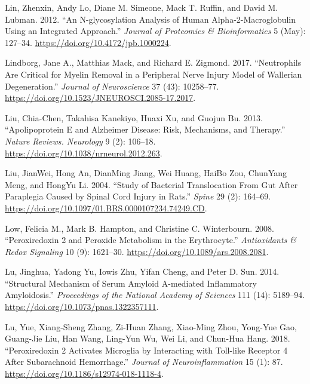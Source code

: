 \documentclass[9pt,lineno]{elife}
\newlength{\cslhangindent}
\newlength{\cslentryspacingunit} %
\newenvironment{CSLReferences}[2] %
 {%
  \setlength{\parindent}{0pt}
  \ifodd #1
  \let\oldpar\par
  \def\par{\hangindent=\cslhangindent\oldpar}
  \fi
  \setlength{\parskip}{#2\cslentryspacingunit}
 }%
 {}
\begin{document}
\begin{CSLReferences}{1}{0}
\leavevmode{}%
Lin, Zhenxin, Andy Lo, Diane M. Simeone, Mack T. Ruffin, and David M. Lubman. 2012. {``An {N-glycosylation Analysis} of {Human Alpha-2-Macroglobulin Using} an {Integrated Approach}.''} \emph{Journal of Proteomics \& Bioinformatics} 5 (May): 127--34. \url{https://doi.org/10.4172/jpb.1000224}.

\leavevmode{}%
Lindborg, Jane A., Matthias Mack, and Richard E. Zigmond. 2017. {``Neutrophils {Are Critical} for {Myelin Removal} in a {Peripheral Nerve Injury Model} of {Wallerian Degeneration}.''} \emph{Journal of Neuroscience} 37 (43): 10258--77. \url{https://doi.org/10.1523/JNEUROSCI.2085-17.2017}.

\leavevmode{}%
Liu, Chia-Chen, Takahisa Kanekiyo, Huaxi Xu, and Guojun Bu. 2013. {``Apolipoprotein {E} and {Alzheimer} Disease: Risk, Mechanisms, and Therapy.''} \emph{Nature Reviews. Neurology} 9 (2): 106--18. \url{https://doi.org/10.1038/nrneurol.2012.263}.

\leavevmode{}%
Liu, JianWei, Hong An, DianMing Jiang, Wei Huang, HaiBo Zou, ChunYang Meng, and HongYu Li. 2004. {``Study of {Bacterial Translocation From Gut After Paraplegia Caused} by {Spinal} Cord {Injury} in {Rats}.''} \emph{Spine} 29 (2): 164--69. \url{https://doi.org/10.1097/01.BRS.0000107234.74249.CD}.

\leavevmode{}%
Low, Felicia M., Mark B. Hampton, and Christine C. Winterbourn. 2008. {``Peroxiredoxin 2 and {Peroxide Metabolism} in the {Erythrocyte}.''} \emph{Antioxidants \& Redox Signaling} 10 (9): 1621--30. \url{https://doi.org/10.1089/ars.2008.2081}.

\leavevmode{}%
Lu, Jinghua, Yadong Yu, Iowis Zhu, Yifan Cheng, and Peter D. Sun. 2014. {``Structural Mechanism of Serum Amyloid {A-mediated} Inflammatory Amyloidosis.''} \emph{Proceedings of the National Academy of Sciences} 111 (14): 5189--94. \url{https://doi.org/10.1073/pnas.1322357111}.

\leavevmode{}%
Lu, Yue, Xiang-Sheng Zhang, Zi-Huan Zhang, Xiao-Ming Zhou, Yong-Yue Gao, Guang-Jie Liu, Han Wang, Ling-Yun Wu, Wei Li, and Chun-Hua Hang. 2018. {``Peroxiredoxin 2 Activates Microglia by Interacting with {Toll-like} Receptor 4 After Subarachnoid Hemorrhage.''} \emph{Journal of Neuroinflammation} 15 (1): 87. \url{https://doi.org/10.1186/s12974-018-1118-4}.


\end{CSLReferences}
\end{document}
